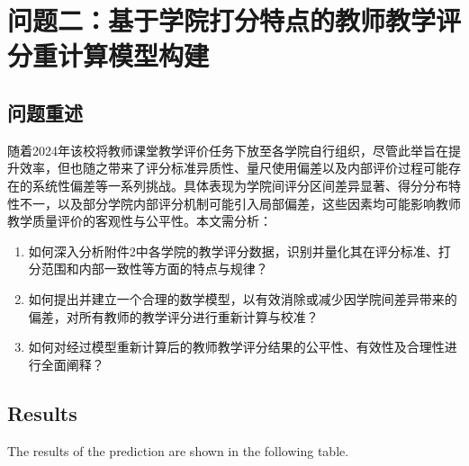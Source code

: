 \section{问题二：基于学院打分特点的教师教学评分重计算模型构建}


\subsection{问题重述}

随着2024年该校将教师课堂教学评价任务下放至各学院自行组织，尽管此举旨在提升效率，但也随之带来了评分标准异质性、量尺使用偏差以及内部评价过程可能存在的系统性偏差等一系列挑战。具体表现为学院间评分区间差异显著、得分分布特性不一，以及部分学院内部评分机制可能引入局部偏差，这些因素均可能影响教师教学质量评价的客观性与公平性。本文需分析：

\begin{enumerate}
    \item 如何深入分析附件2中各学院的教学评分数据，识别并量化其在评分标准、打分范围和内部一致性等方面的特点与规律？
    \item 如何提出并建立一个合理的数学模型，以有效消除或减少因学院间差异带来的偏差，对所有教师的教学评分进行重新计算与校准？
    \item 如何对经过模型重新计算后的教师教学评分结果的公平性、有效性及合理性进行全面阐释？
\end{enumerate}

\subsection{Results}

The results of the prediction are shown in the following table.

